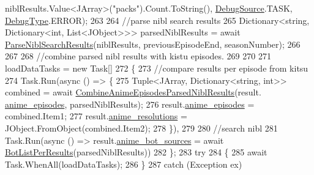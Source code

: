 \begin{DoxyCode}
      niblResults.Value<JArray>(\textcolor{stringliteral}{"packs"}).Count.ToString(), \mbox{\hyperlink{namespace_little_weeb_library_1_1_handlers_a2a6ca0775121c9c503d58aa254d292be}{DebugSource}}.TASK, 
      \mbox{\hyperlink{namespace_little_weeb_library_1_1_handlers_ab66019ed40462876ec4e61bb3ccb0a62}{DebugType}}.ERROR);
263 
264                     \textcolor{comment}{//parse nibl search results}
265                     Dictionary<string, Dictionary<int, List<JObject>>> parsedNiblResults = await 
      \mbox{\hyperlink{class_little_weeb_library_1_1_handlers_1_1_anime_profile_handler_a92412693abdf9ea697e6b793b71d468f}{ParseNiblSearchResults}}(niblResults, previousEpisodeEnd, seasonNumber);
266 
267 
268                     \textcolor{comment}{//combine parsed nibl results with kistu episodes.}
269 
270 
271                     loadDataTasks = \textcolor{keyword}{new} Task[]
272                     \{
273                         \textcolor{comment}{//compare results per episode from kitsu}
274                         Task.Run(async () => \{
275                             Tuple<JArray, Dictionary<string, int>> combined = await 
      \mbox{\hyperlink{class_little_weeb_library_1_1_handlers_1_1_anime_profile_handler_a132e4da0f082cc2c967cd06eaac3337b}{CombineAnimeEpisodesParsedNiblResults}}(result.
      \mbox{\hyperlink{class_little_weeb_library_1_1_models_1_1_json_kitsu_anime_info_ae788c0962dabe5e210fba53aecae820d}{anime\_episodes}}, parsedNiblResults);
276                             result.\mbox{\hyperlink{class_little_weeb_library_1_1_models_1_1_json_kitsu_anime_info_ae788c0962dabe5e210fba53aecae820d}{anime\_episodes}} = combined.Item1;
277                             result.\mbox{\hyperlink{class_little_weeb_library_1_1_models_1_1_json_kitsu_anime_info_a10f0da892462fa2f1817e08336aea4ff}{anime\_resolutions}} = JObject.FromObject(combined.Item2);
278                         \}),
279                 
280                         \textcolor{comment}{//search nibl}
281                         Task.Run(async () => result.\mbox{\hyperlink{class_little_weeb_library_1_1_models_1_1_json_kitsu_anime_info_aca4b832adca7f1916bee332b2b8b312f}{anime\_bot\_sources}} = await 
      \mbox{\hyperlink{class_little_weeb_library_1_1_handlers_1_1_anime_profile_handler_a1bb944a0f0871b23484be89e2cf8705f}{BotListPerResults}}(parsedNiblResults))
282                     \};
283                     \textcolor{keywordflow}{try}
284                     \{
285                         await Task.WhenAll(loadDataTasks);
286                     \}
287                     \textcolor{keywordflow}{catch} (Exception ex)

\end{DoxyCode}
